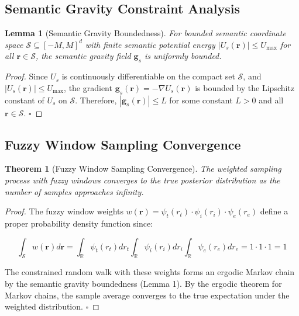 \documentclass[12pt,a4paper]{article}
\newtheorem{theorem}{Theorem}
\newtheorem{lemma}{Lemma}
\begin{document}
\subsection{Semantic Gravity Constraint Analysis}

\begin{lemma}[Semantic Gravity Boundedness]
For bounded semantic coordinate space $\mathcal{S} \subseteq [-M, M]^d$ with finite semantic potential energy $|U_s(\mathbf{r})| \leq U_{\max}$ for all $\mathbf{r} \in \mathcal{S}$, the semantic gravity field $\mathbf{g}_s$ is uniformly bounded.
\end{lemma}

\begin{proof}
Since $U_s$ is continuously differentiable on the compact set $\mathcal{S}$, and $|U_s(\mathbf{r})| \leq U_{\max}$, the gradient $\mathbf{g}_s(\mathbf{r}) = -\nabla U_s(\mathbf{r})$ is bounded by the Lipschitz constant of $U_s$ on $\mathcal{S}$. Therefore, $|\mathbf{g}_s(\mathbf{r})| \leq L$ for some constant $L > 0$ and all $\mathbf{r} \in \mathcal{S}$. $\square$
\end{proof}

\subsection{Fuzzy Window Sampling Convergence}

\begin{theorem}[Fuzzy Window Sampling Convergence]
The weighted sampling process with fuzzy windows converges to the true posterior distribution as the number of samples approaches infinity.
\end{theorem}

\begin{proof}
The fuzzy window weights $w(\mathbf{r}) = \psi_t(r_t) \cdot \psi_i(r_i) \cdot \psi_e(r_e)$ define a proper probability density function since:

\begin{equation}
\int_{\mathcal{S}} w(\mathbf{r}) d\mathbf{r} = \int_{\mathbb{R}} \psi_t(r_t) dr_t \int_{\mathbb{R}} \psi_i(r_i) dr_i \int_{\mathbb{R}} \psi_e(r_e) dr_e = 1 \cdot 1 \cdot 1 = 1
\end{equation}

The constrained random walk with these weights forms an ergodic Markov chain by the semantic gravity boundedness (Lemma 1). By the ergodic theorem for Markov chains, the sample average converges to the true expectation under the weighted distribution. $\square$
\end{proof}
\end{document}
